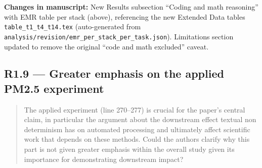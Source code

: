 \documentclass[11pt,a4paper]{article}
\newenvironment{revquote}{%
  \begin{quote}\small\itshape\color{revgray}
}{%
  \end{quote}
}
\newcommand{\changes}[1]{\par\noindent\textbf{\color{revblue}Changes in manuscript:} #1\par}
\begin{document}
\changes{New Results subsection ``Coding and math reasoning'' with EMR table per stack (above), referencing the new Extended Data tables \texttt{table\_t1\_t4\_t14.tex} (auto-generated from \texttt{analysis/revision/emr\_per\_stack\_per\_task.json}). Limitations section updated to remove the original ``code and math excluded'' caveat.}

\subsection*{R1.9 --- Greater emphasis on the applied PM2.5 experiment}

\begin{revquote}
The applied experiment (line 270--277) is crucial for the paper's central claim, in particular the argument about the downstream effect textual non determinism has on automated processing and ultimately affect scientific work that depends on these methods. Could the authors clarify why this part is not given greater emphasis within the overall study given its importance for demonstrating downstream impact?
\end{revquote}
\end{document}
